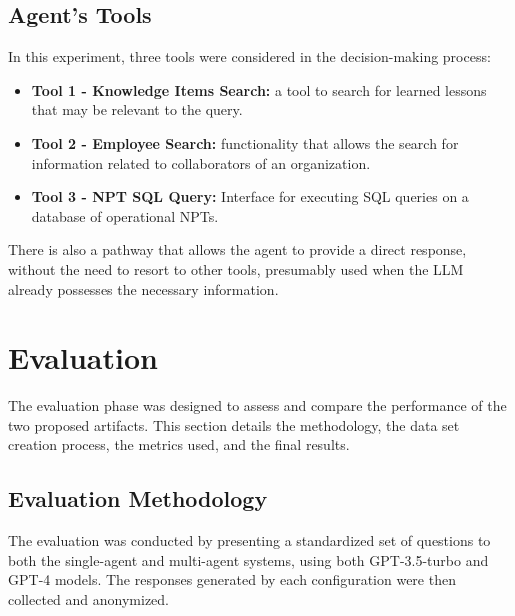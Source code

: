                 

        \subsection{Agent's Tools}
            
            In this experiment, three tools were considered in the decision-making process:

            \begin{itemize}            
                
                \item \textbf{Tool 1 - Knowledge Items Search:} a tool to search for learned lessons that may be relevant to the query. 
                \label{Tool1}
        
                \item \label{Tool2} \textbf{Tool 2 - Employee Search:} functionality that allows the search for information related to collaborators of an organization.
        
                \item \label{Tool3} \textbf{Tool 3 - NPT SQL Query:} Interface for executing SQL queries on a database of operational NPTs.    
                
            \end{itemize}

            There is also a pathway that allows the agent to provide a direct response, without the need to resort to other tools, presumably used when the LLM already possesses the necessary information.

    \section{Evaluation}

        The evaluation phase was designed to assess and compare the performance of the two proposed artifacts. This section details the methodology, the data set creation process, the metrics used, and the final results.

        \subsection{Evaluation Methodology}
        
            The evaluation was conducted by presenting a standardized set of questions to both the single-agent and multi-agent systems, using both GPT-3.5-turbo and GPT-4 models. The responses generated by each configuration were then collected and anonymized.

